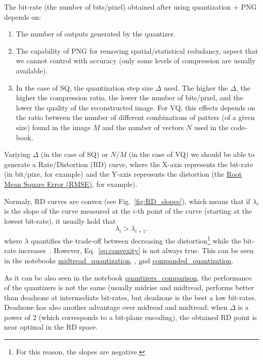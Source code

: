 The bit-rate (the number of bits/pixel) obtained after using
quantization + PNG depends on:
\begin{enumerate}
\item The number of outputs generated by the quantizer.
\item The capability of PNG for removing spatial/statistical
  redudancy, aspect that we cannot control with accuracy (only some
  levels of compression are usually available).
\item In the case of SQ, the quantization step size $\Delta$ used. The
  higher the $\Delta$, the higher the compression ratio, the lower the
  number of bits/pixel, and the lower the quality of the reconstructed
  image. For VQ, this effects depends on the ratio between the number
  of different combinations of patters (of a given size) found in the
  image $M$ and the number of vectors $N$ used in the code-book.
\end{enumerate}
Variying $\Delta$ (in the case of SQ) or $N/M$ (in the case of VQ) we
should be able to generate a Rate/Distortion (RD) curve, where the
X-axis represents the bit-rate (in bit/pixe, for example) and the
Y-axis represents the distortion (the
\href{https://en.wikipedia.org/wiki/Root-mean-square_deviation}{Root
  Mean Square Error (RMSE)}, for example).

Normaly, RD curves are convex (see Fig.~\ref{fig:RD_slopes}), which
means that if $\lambda_i$ is the slope of the curve measured at the
$i$-th point of the curve (starting at the lowest bit-rate), it
usually hold that
\begin{equation}
  \lambda_i > \lambda_{i+1}.
  \label{eq:convexity}
\end{equation}
where $\lambda$ quantifies the trade-off between decreasing the
distortion\footnote{For this reason, the slopes are negative.} while
the bit-rate
increases~\cite{vetterli1995wavelets,sayood2017introduction}. However,
Eq.~\ref{eq:convexity} is not always true. This can be seen in the
notebooks \href{}{midtread\_quantization},
\href{midrise\_quantization}, \href{deadzone\_quantization} and
\href{}{companded\_quantization}.

As it can be also seen in the notebook
\href{}{quantizers\_comparison}, the performance of the quantizers is
not the same (usually midrise and midtread, performs better than
deadzone at intermediate bit-rates, but deadzone is the best a low
bit-rates. Deadzone has also another advantage over midread and
midtread: when $\Delta$ is a power of 2 (which corresponds to a
bit-plane encoding), the obtained RD point is near optimal in the RD
space.

